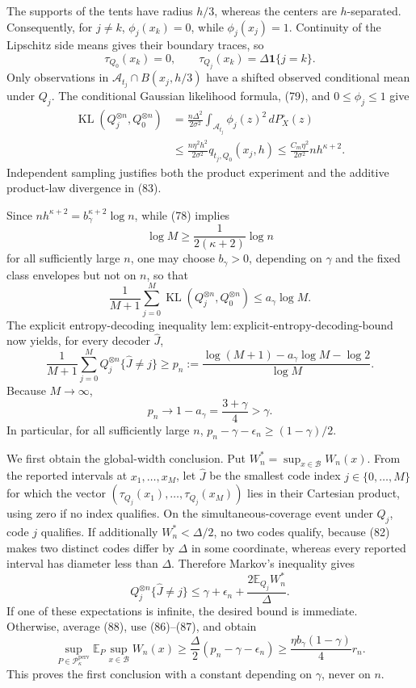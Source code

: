 The supports of the tents have radius \(h/3\), whereas the centers are \(h\)-separated. Consequently, for \(j\ne k\), \(\phi_j(x_k)=0\), while \(\phi_j(x_j)=1\). Continuity of the Lipschitz side means gives their boundary traces, so
\[
 \tau_{Q_0}(x_k)=0,
 \qquad
 \tau_{Q_j}(x_k)=\Delta\mathbf 1\{j=k\}. \tag{82}
\]
Only observations in \(\mathcal A_{t_j}\cap B(x_j,h/3)\) have a shifted observed conditional mean under \(Q_j\). The conditional Gaussian likelihood formula, (79), and \(0\le\phi_j\le1\) give
\[
 \begin{aligned}
 \operatorname{KL}(Q_j^{\otimes n},Q_0^{\otimes n})
 &=\frac{n\Delta^2}{2\sigma^2}
   \int_{\mathcal A_{t_j}}\phi_j(z)^2\,dP_X^\circ(z)\\
 &\le\frac{n\eta^2h^2}{2\sigma^2}q_{t_j,Q_0}(x_j,h)
 \le \frac{C_m\eta^2}{2\sigma^2}nh^{\kappa+2}.
 \end{aligned} \tag{83}
\]
Independent sampling justifies both the product experiment and the additive product-law divergence in (83).

Since \(nh^{\kappa+2}=b_\gamma^{\kappa+2}\log n\), while (78) implies
\[
 \log M\ge \frac{1}{2(\kappa+2)}\log n \tag{84}
\]
for all sufficiently large \(n\), one may choose \(b_\gamma>0\), depending on \(\gamma\) and the fixed class envelopes but not on \(n\), so that
\[
 \frac1{M+1}\sum_{j=0}^M
 \operatorname{KL}(Q_j^{\otimes n},Q_0^{\otimes n})
 \le a_\gamma\log M. \tag{85}
\]
The explicit entropy-decoding inequality \(\mathrm{lem:explicit\text{-}entropy\text{-}decoding\text{-}bound}\) now yields, for every decoder \(\widehat J\),
\[
 \frac1{M+1}\sum_{j=0}^M Q_j^{\otimes n}\{\widehat J\ne j\}
 \ge p_n:=\frac{\log(M+1)-a_\gamma\log M-\log2}{\log M}. \tag{86}
\]
Because \(M\to\infty\),
\[
 p_n\longrightarrow1-a_\gamma=\frac{3+\gamma}{4}>\gamma. \tag{87}
\]
In particular, for all sufficiently large \(n\), \(p_n-\gamma-\epsilon_n\ge(1-\gamma)/2\).

We first obtain the global-width conclusion. Put \(W_n^*=\sup_{x\in\mathcal B}W_n(x)\). From the reported intervals at \(x_1,\ldots,x_M\), let \(\widehat J\) be the smallest code index \(j\in\{0,\ldots,M\}\) for which the vector \((\tau_{Q_j}(x_1),\ldots,\tau_{Q_j}(x_M))\) lies in their Cartesian product, using zero if no index qualifies. On the simultaneous-coverage event under \(Q_j\), code \(j\) qualifies. If additionally \(W_n^*<\Delta/2\), no two codes qualify, because (82) makes two distinct codes differ by \(\Delta\) in some coordinate, whereas every reported interval has diameter less than \(\Delta\). Therefore Markov's inequality gives
\[
 Q_j^{\otimes n}\{\widehat J\ne j\}
 \le\gamma+\epsilon_n+
 \frac{2\mathbb E_{Q_j}W_n^*}{\Delta}. \tag{88}
\]
If one of these expectations is infinite, the desired bound is immediate. Otherwise, average (88), use (86)--(87), and obtain
\[
 \sup_{P\in\mathcal P_{\kappa}^{\mathrm{perv}}}
 \mathbb E_P\sup_{x\in\mathcal B}W_n(x)
 \ge\frac{\Delta}{2}(p_n-\gamma-\epsilon_n)
 \ge\frac{\eta b_\gamma(1-\gamma)}4 r_n. \tag{89}
\]
This proves the first conclusion with a constant depending on \(\gamma\), never on \(n\).

